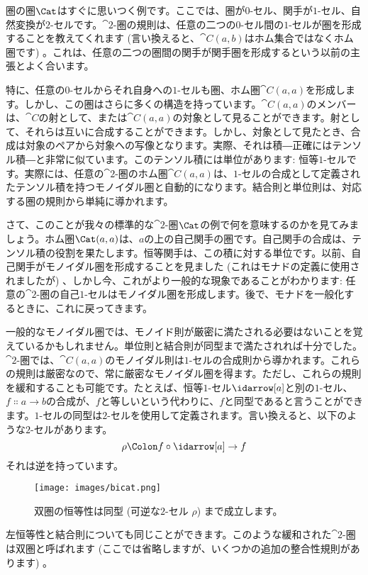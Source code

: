 \noindent
圏の圏$\Cat$はすぐに思いつく例です。ここでは、圏が$0$-セル、関手が$1$-セル、自然変換が$2$-セルです。$\cat{2}$-圏の規則は、任意の二つの$0$-セル間の$1$-セルが圏を形成することを教えてくれます (言い換えると、$\cat{C}(a, b)$はホム集合ではなくホム圏です) 。これは、任意の二つの圏間の関手が関手圏を形成するという以前の主張とよく合います。

特に、任意の$0$-セルからそれ自身への$1$-セルも圏、ホム圏$\cat{C}(a, a)$を形成します。しかし、この圏はさらに多くの構造を持っています。$\cat{C}(a, a)$のメンバーは、$\cat{C}$の射として、または$\cat{C}(a, a)$の対象として見ることができます。射として、それらは互いに合成することができます。しかし、対象として見たとき、合成は対象のペアから対象への写像となります。実際、それは積―正確にはテンソル積―と非常に似ています。このテンソル積には単位があります: 恒等$1$-セルです。実際には、任意の$\cat{2}$-圏のホム圏$\cat{C}(a, a)$は、$1$-セルの合成として定義されたテンソル積を持つモノイダル圏と自動的になります。結合則と単位則は、対応する圏の規則から単純に導かれます。

さて、このことが我々の標準的な$\cat{2}$-圏$\Cat$の例で何を意味するのかを見てみましょう。ホム圏$\Cat(a, a)$は、$a$の上の自己関手の圏です。自己関手の合成は、テンソル積の役割を果たします。恒等関手は、この積に対する単位です。以前、自己関手がモノイダル圏を形成することを見ました (これはモナドの定義に使用されましたが) 、しかし今、これがより一般的な現象であることがわかります: 任意の$\cat{2}$-圏の自己$1$-セルはモノイダル圏を形成します。後で、モナドを一般化するときに、これに戻ってきます。

一般的なモノイダル圏では、モノイド則が厳密に満たされる必要はないことを覚えているかもしれません。単位則と結合則が同型まで満たされれば十分でした。$\cat{2}$-圏では、$\cat{C}(a, a)$のモノイダル則は$1$-セルの合成則から導かれます。これらの規則は厳密なので、常に厳密なモノイダル圏を得ます。ただし、これらの規則を緩和することも可能です。たとえば、恒等$1$-セル$\idarrow[a]$と別の$1$-セル、$f \Colon a \to b$の合成が、$f$と等しいという代わりに、$f$と同型であると言うことができます。$1$-セルの同型は$2$-セルを使用して定義されます。言い換えると、以下のような$2$-セルがあります。
\[\rho \Colon f \circ \idarrow[a] \to f\]
それは逆を持っています。

\begin{figure}[H]
  \centering
  \texttt{[image: images/bicat.png]}
  \caption{双圏の恒等性は同型 (可逆な$2$-セル $\rho$) まで成立します。}
\end{figure}

\noindent
左恒等性と結合則についても同じことができます。このような緩和された$\cat{2}$-圏は双圏と呼ばれます (ここでは省略しますが、いくつかの追加の整合性規則があります) 。


